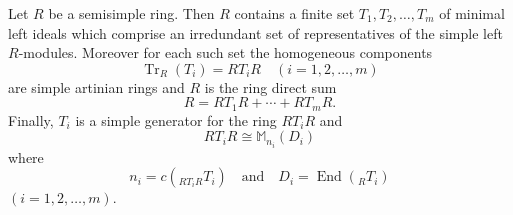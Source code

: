 Let $R$ be a semisimple ring. Then $R$ contains a finite set $T_1, T_2, \ldots, T_m$ of minimal left ideals which comprise an irredundant set of representatives of the simple left $R$-modules. Moreover for each such set the homogeneous components
$$\operatorname{Tr}_R(T_i) = R T_i R \quad (i = 1, 2, \ldots, m)$$
are simple artinian rings and $R$ is the ring direct sum
$$R = R T_1 R + \cdots + R T_m R.$$
Finally, $T_i$ is a simple generator for the ring $R T_i R$ and
$$R T_i R \cong \mathbb{M}_{n_i}(D_i)$$
where
$$n_i = c({}_{R T_i R} T_i) \quad \text{and} \quad D_i = \operatorname{End}({}_R T_i)$$
$(i = 1, 2, \ldots, m)$.
